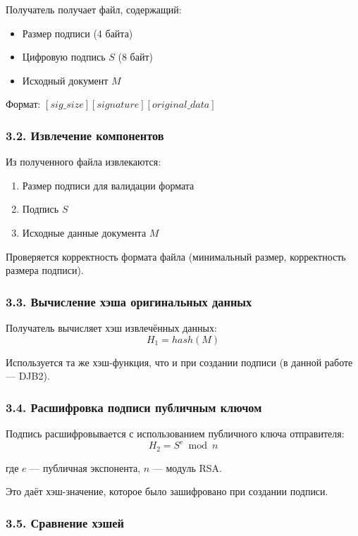Получатель получает файл, содержащий:
\begin{itemize}
    \item Размер подписи (4 байта)
    \item Цифровую подпись $S$ (8 байт)
    \item Исходный документ $M$
\end{itemize}

Формат: $[sig\_size][signature][original\_data]$

\subsubsection*{3.2. Извлечение компонентов}

Из полученного файла извлекаются:
\begin{enumerate}
    \item Размер подписи для валидации формата
    \item Подпись $S$
    \item Исходные данные документа $M$
\end{enumerate}

Проверяется корректность формата файла (минимальный размер, корректность размера подписи).

\subsubsection*{3.3. Вычисление хэша оригинальных данных}

Получатель вычисляет хэш извлечённых данных:
$$H_1 = hash(M)$$

Используется та же хэш-функция, что и при создании подписи (в данной работе — DJB2).

\subsubsection*{3.4. Расшифровка подписи публичным ключом}

Подпись расшифровывается с использованием публичного ключа отправителя:
$$H_2 = S^e \bmod n$$

где $e$ — публичная экспонента, $n$ — модуль RSA.

Это даёт хэш-значение, которое было зашифровано при создании подписи.

\subsubsection*{3.5. Сравнение хэшей}

